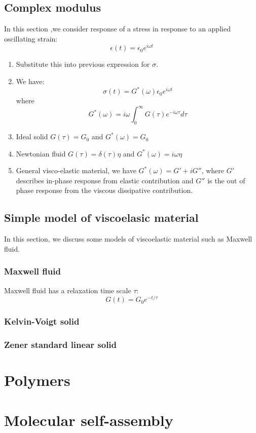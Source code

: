 \documentclass[12pt,a4paper]{article}
\begin{document}
\subsection{Complex modulus}
    In this section ,we consider response of a stress in response to an applied oscillating strain:
    \begin{equation}
        \epsilon(t)=\epsilon_0 e^{i\omega t}
    \end{equation}
    \begin{enumerate}
        \item Substitute this into previous expression for $\sigma$.
        \item We have:
        \begin{equation}
            \sigma(t) = G^{*}(\omega)\epsilon_0 e^{i\omega t}
        \end{equation}
        where
        \begin{equation}
            G^{*}(\omega) = i\omega \int^{\infty}_{0} G(\tau)e^{-i\omega \tau} d\tau
        \end{equation}
        \item Ideal solid $G(\tau)=G_0$ and $G^{*}(\omega) = G_0$
        \item Newtonian fluid $G(\tau)=\delta(\tau)\eta$ and $G^{*}(\omega) = i \omega \eta$
        \item General visco-elastic material, we have $G^{*}(\omega) = G'+i G''$, where $G'$ describes in-phase response from elastic contribution and $G''$  is the out of phase response from the viscous dissipative contribution.
    \end{enumerate}
\subsection{Simple model of viscoelasic material}
In this section, we discuss some models of viscoelastic material such as Maxwell fluid. 
    \subsubsection{Maxwell fluid}
    Maxwell fluid has a relaxation time scale $\tau$:
    \begin{equation}
        G(t) = G_0 e^{-t/\tau}
    \end{equation}
    \subsubsection{Kelvin-Voigt solid}
    \subsubsection{Zener standard linear solid}
\section{Polymers}
\section{Molecular self-assembly}
\end{document}
